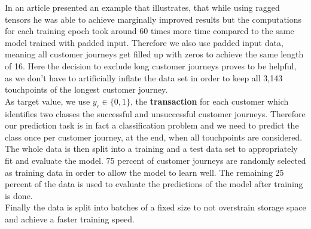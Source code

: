 In an article \cite{patton-2022} presented an example that illustrates, that while using ragged tensors he was able to achieve marginally improved results but the computations for each training epoch took around 60 times more time compared to the same model trained with padded input. 
Therefore we also use padded input data, meaning all customer journeys get filled up with zeros to achieve the same length of 16. Here the decision to exclude long customer journeys proves to be helpful, as we don't have to artificially inflate the data set in order to keep all 3,143 touchpoints of the longest customer journey. \\
As target value, we use $y_c\in\{0,1\}$, the \textbf{transaction} for each customer which identifies two classes the successful and unsuccessful customer journeys. Therefore our prediction task is in fact a classification problem and we need to predict the class once per customer journey, at the end, when all touchpoints are considered. \\
The whole data is then split into a training and a test data set to appropriately fit and evaluate the model. 75 percent of customer journeys are randomly selected as training data in order to allow the model to learn well. 
The remaining 25 percent of the data is used to evaluate the predictions of the model after training is done. \\
Finally the data is split into batches of a fixed size to not overstrain storage space and achieve a faster training speed.\\
